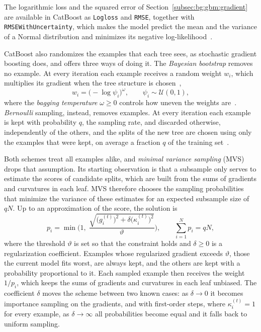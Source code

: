    The logarithmic loss and the squared error of
    Section~\ref{subsec:bg:gbm:gradient} are available in CatBoost as
    \texttt{Logloss} and \texttt{RMSE}, together with \texttt{RMSEWithUncertainty},
    which makes the model predict the mean and the variance of a Normal
    distribution and minimizes its negative log-likelihood~\cite{malinin2021}.

    CatBoost also randomizes the examples that each tree sees, as
    stochastic gradient boosting does, and offers three ways of doing it. The
    \emph{Bayesian bootstrap} removes no example. At every iteration each example
    receives a random weight $w_i$, which multiplies its gradient when the tree
    structure is chosen~\cite{rubin1981},
    \begin{equation}
    w_i = \bigl( -\log \psi_i \bigr)^{\omega},
    \qquad \psi_i \sim \mathcal{U}(0, 1),
    \label{eq:bg:gbm:bayesboot}
    \end{equation}
    where the \emph{bagging temperature} $\omega \ge 0$ controls how uneven the
    weights are~\cite{catboostdocs}. \emph{Bernoulli} sampling, instead,
    removes examples. At every iteration each example is kept with probability
    $q$, the sampling rate, and discarded otherwise, independently of the others,
    and the splits of the new tree are chosen using only the examples that were
    kept, on average a fraction $q$ of the training
    set~\cite{catboostbootstrap}.

    Both schemes treat all examples alike, and \emph{minimal variance sampling}
    (MVS)~\cite{ibragimov2019} drops that assumption. Its starting observation is
    that a subsample only serves to estimate the scores of candidate splits, which
    are built from the sums of gradients and curvatures in each leaf. MVS
    therefore chooses the sampling probabilities that minimize the variance of
    these estimates for an expected subsample size of $qN$. Up to an
    approximation of the score, the solution is
    \begin{equation}
    p_i = \min\Biggl( 1,\;
    \frac{\sqrt{\bigl(g_i^{(t)}\bigr)^2 + \delta \bigl(\kappa_i^{(t)}\bigr)^2}}{\vartheta} \Biggr),
    \qquad \sum_{i=1}^{N} p_i = qN,
    \label{eq:bg:gbm:mvs}
    \end{equation}
    where the threshold $\vartheta$ is set so that the constraint holds and
    $\delta \ge 0$ is a regularization coefficient. Examples
    whose regularized gradient exceeds $\vartheta$, those the current model fits
    worst, are always kept, and the others are kept with a probability
    proportional to it. Each sampled example then receives the weight $1/p_i$,
    which keeps the sums of gradients and curvatures in each leaf unbiased. The
    coefficient $\delta$ moves the scheme between two known cases: as $\delta \to
    0$ it becomes importance sampling on the gradients, and with first-order
    steps, where $\kappa_i^{(t)} = 1$ for every example, as $\delta \to \infty$
    all probabilities become equal and it falls back to uniform sampling.

